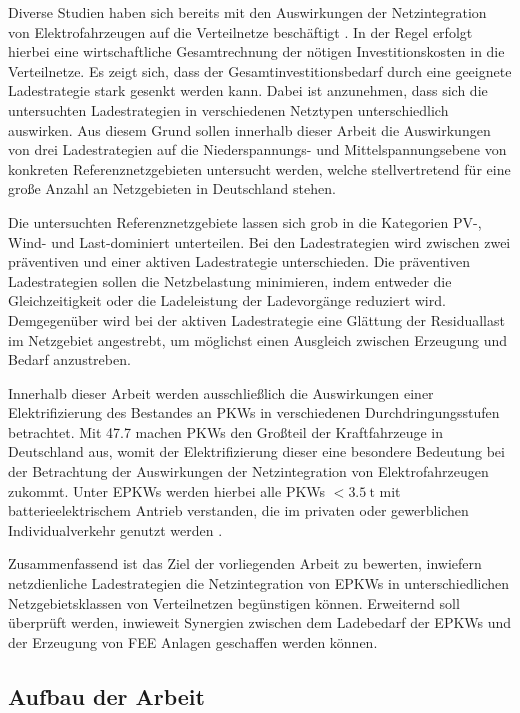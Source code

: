 Diverse Studien haben sich bereits mit den Auswirkungen der Netzintegration von Elektrofahrzeugen auf die Verteilnetze beschäftigt \cite{Agora2019} \cite{DEAGH2018} \cite{BCG2018}.
In der Regel erfolgt hierbei eine wirtschaftliche Gesamtrechnung der nötigen Investitionskosten in die Verteilnetze.
Es zeigt sich, dass der Gesamtinvestitionsbedarf durch eine geeignete Ladestrategie stark gesenkt werden kann.
Dabei ist anzunehmen, dass sich die untersuchten Ladestrategien in verschiedenen Netztypen unterschiedlich auswirken.
Aus diesem Grund sollen innerhalb dieser Arbeit die Auswirkungen von drei Ladestrategien auf die Niederspannungs- und Mittelspannungsebene von konkreten Referenznetzgebieten untersucht werden, welche stellvertretend für eine große Anzahl an Netzgebieten in Deutschland stehen.\medskip

Die untersuchten Referenznetzgebiete lassen sich grob in die Kategorien \gls{PV}-, Wind- und Last-dominiert unterteilen.
Bei den Ladestrategien wird zwischen zwei präventiven und einer aktiven Ladestrategie unterschieden.
Die präventiven Ladestrategien sollen die Netzbelastung minimieren, indem entweder die Gleichzeitigkeit oder die Ladeleistung der Ladevorgänge reduziert wird.
Demgegenüber wird bei der aktiven Ladestrategie eine Glättung der Residuallast im Netzgebiet angestrebt, um möglichst einen Ausgleich zwischen Erzeugung und Bedarf anzustreben.\medskip

Innerhalb dieser Arbeit werden ausschließlich die Auswirkungen einer Elektrifizierung des Bestandes an \glspl{PKW} in verschiedenen Durchdringungsstufen betrachtet.
Mit \SI{47.7}{\MioFZs} \cite{KBA2020a} machen \glspl{PKW} den Großteil der Kraftfahrzeuge in Deutschland aus, womit der Elektrifizierung dieser eine besondere Bedeutung bei der Betrachtung der Auswirkungen der Netzintegration von Elektrofahrzeugen zukommt.
Unter \glspl{EPKW} werden hierbei alle \glspl{PKW} \(<\!\SI{3.5}{\tonne}\) mit batterieelektrischem Antrieb verstanden, die im privaten oder gewerblichen Individualverkehr genutzt werden \cite{BNetzA2020}. \medskip

Zusammenfassend ist das Ziel der vorliegenden Arbeit zu bewerten, inwiefern netzdienliche Ladestrategien die Netzintegration von \glspl{EPKW} in unterschiedlichen Netzgebietsklassen von Verteilnetzen begünstigen können.
Erweiternd soll überprüft werden, inwieweit Synergien zwischen dem Ladebedarf der \glspl{EPKW} und der Erzeugung von \gls{FEE} Anlagen geschaffen werden können.


\subsection{Aufbau der Arbeit}


